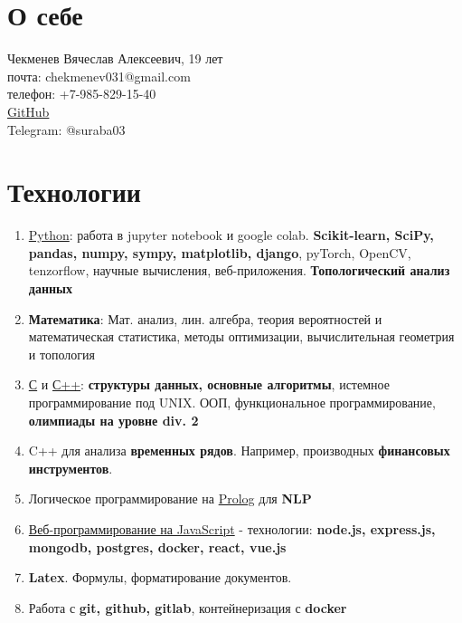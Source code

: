 \documentclass[a4paper,12pt]{article}
\date{}
\begin{document}
\section{О себе}
      \large Чекменев Вячеслав Алексеевич, 19 лет\\
      \large почта: chekmenev031@gmail.com \\
      \large телефон: +7-985-829-15-40 \\
      \large \href{https://github.com/Suraba03}{GitHub} \\
      \large Telegram: @suraba03\\
\section{Технологии}
\begin{enumerate}
    \item \underline{Python}: работа в jupyter notebook и google colab. \textbf{Scikit-learn, SciPy, pandas, numpy, sympy, matplotlib, django}, pyTorch, OpenCV, tenzorflow, научные вычисления, веб-приложения. \textbf{Топологический анализ данных}
    \item \textbf{Математика}: Мат. анализ, лин. алгебра, теория вероятностей и математическая статистика, методы оптимизации, вычислительная геометрия и топология
    \item \underline{С} и \underline{С++}: \textbf{структуры данных, основные алгоритмы}, истемное программирование под UNIX. ООП, функциональное программирование, \textbf{олимпиады на уровне div. 2} 
    \item C++ для анализа \textbf{временных рядов}. Например, производных \textbf{финансовых инструментов}.
    \item Логическое программирование на \underline{Prolog} для \textbf{NLP}
    \item \underline{Веб-программирование на JavaScript} - технологии: \textbf{node.js, express.js, mongodb, postgres, docker, react, vue.js}
    \item \textbf{Latex}. Формулы, форматирование документов.
    \item Работа с \textbf{git, github, gitlab}, контейнеризация с \textbf{docker}

\end{enumerate}
\end{document}
